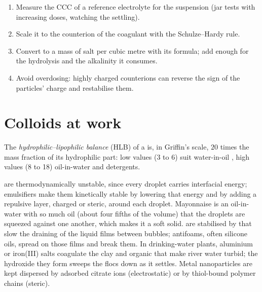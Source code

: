 \begin{method}\label{met:b3:colloids:coagulant-dose}
\begin{enumerate}
  \item Measure the CCC of a reference electrolyte for the suspension (jar tests
        with increasing doses, watching the settling).
  \item Scale it to the counterion of the coagulant with the Schulze--Hardy rule.
  \item Convert to a mass of salt per cubic metre with its formula; add enough
        for the hydrolysis and the alkalinity it consumes.
  \item Avoid overdosing: highly charged counterions can reverse the sign of
        the particles' charge and restabilise them.
\end{enumerate}
\end{method}

\section{Colloids at work}

\begin{definition}\label{def:b3:colloids:hlb}
The \emph{hydrophilic--lipophilic balance}
(HLB) of a  is, in Griffin's scale, $20$ times the mass
fraction of its hydrophilic part: low values (3 to 6) suit water-in-oil
, high values (8 to 18) oil-in-water  and detergents.
\end{definition}

 are thermodynamically unstable, since every droplet carries
interfacial energy; emulsifiers make them kinetically stable by lowering that
energy and by adding a repulsive layer, charged or steric, around each droplet.
Mayonnaise is an oil-in-water  with so much oil (about four fifths of
the volume) that the droplets are squeezed against one another, which makes it
a soft solid.  are stabilised by  that slow the draining of the
liquid films between bubbles; antifoams, often silicone oils, spread on those
films and break them. In drinking-water plants, aluminium or iron(III) salts
coagulate the clay and organic  that make river water turbid; the
hydroxide they form sweeps the flocs down as it settles. Metal nanoparticles
are kept dispersed by adsorbed citrate ions (electrostatic) or by thiol-bound
polymer chains (steric).

